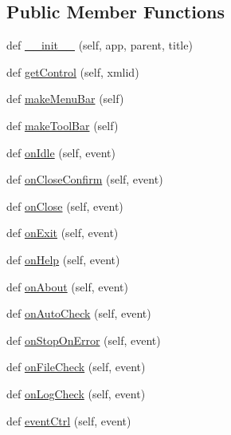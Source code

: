 \subsection*{Public Member Functions}
\begin{DoxyCompactItemize}
\item 
def \hyperlink{classAppFrame_1_1AppFrame_a6350576290a782b5e32d3f84ed8ed240}{\+\_\+\+\_\+init\+\_\+\+\_\+} (self, app, parent, title)
\item 
def \hyperlink{classAppFrame_1_1AppFrame_aec012d3022e406db34659adb07ef792a}{get\+Control} (self, xmlid)
\item 
def \hyperlink{classAppFrame_1_1AppFrame_a39ad7daf6cc1af75dc9ac03aa19a055c}{make\+Menu\+Bar} (self)
\item 
def \hyperlink{classAppFrame_1_1AppFrame_a87b3da963f037a94fe92a9209a6d1302}{make\+Tool\+Bar} (self)
\item 
def \hyperlink{classAppFrame_1_1AppFrame_aeaebe92cb0672c1b2f03625d3fbc0c5d}{on\+Idle} (self, event)
\item 
def \hyperlink{classAppFrame_1_1AppFrame_a65bdce54a07b810b589c6c0096c0c78d}{on\+Close\+Confirm} (self, event)
\item 
def \hyperlink{classAppFrame_1_1AppFrame_aa606dfde54071fb64f9ec980433eebdf}{on\+Close} (self, event)
\item 
def \hyperlink{classAppFrame_1_1AppFrame_a27e6061a0b781a7af1c3a813da24a0a3}{on\+Exit} (self, event)
\item 
def \hyperlink{classAppFrame_1_1AppFrame_ab6921bc4674e0a2ff0c7d1e96e9b989c}{on\+Help} (self, event)
\item 
def \hyperlink{classAppFrame_1_1AppFrame_afeb5cc9b92feb69befb4705e8f06f3e2}{on\+About} (self, event)
\item 
def \hyperlink{classAppFrame_1_1AppFrame_a6dbf7445418dc6934ed33664684aad0e}{on\+Auto\+Check} (self, event)
\item 
def \hyperlink{classAppFrame_1_1AppFrame_ab6fb8d94be671fbbad0a873282e75830}{on\+Stop\+On\+Error} (self, event)
\item 
def \hyperlink{classAppFrame_1_1AppFrame_ae832c27d48d36bf3c50a709db009c2a1}{on\+File\+Check} (self, event)
\item 
def \hyperlink{classAppFrame_1_1AppFrame_a35ce110eb56fd0867d2690889c6e5a35}{on\+Log\+Check} (self, event)
\item 
def \hyperlink{classAppFrame_1_1AppFrame_a471575e362393de2032656c5139e1a6f}{event\+Ctrl} (self, event)
\item 

\end{DoxyCompactItemize}
